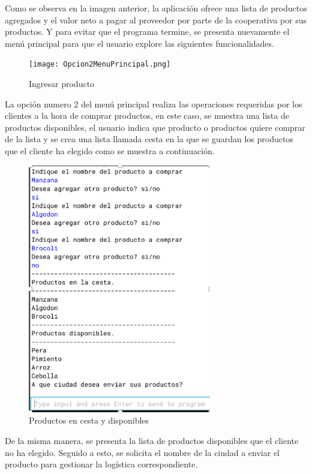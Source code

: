 \documentclass[10pt,a4paper]{article}
\begin{document}
Como se observa en la imagen anterior, la aplicación ofrece  una lista de productos agregados y el valor neto a pagar al proveedor por parte de la cooperativa por sus productos. Y para evitar que el programa termine, se presenta nuevamente el menú principal para que el usuario explore las siguientes funcionalidades.

\begin{figure}[H]
  \centerline{
  \texttt{[image: Opcion2MenuPrincipal.png]}
  }
  \captionsetup{justification=centering}
  \caption{Ingresar producto \label{fig:opcion1MP} }
\end{figure}

La opción numero 2 del menú principal realiza las operaciones requeridas por los clientes a la hora de comprar productos, en este caso, se muestra una lista de productos disponibles, el usuario indica que producto o productos  quiere comprar de la lista y se crea una lista llamada cesta en la que se guardan los productos que el cliente ha elegido como se muestra a continuación.

\begin{figure}[H]
  \centerline{
  \includegraphics[width=8cm]{Cesta.png}
  }
  \captionsetup{justification=centering}
  \caption{Productos en cesta y disponibles \label{fig:opcion1MP} }
\end{figure}

De la misma manera, se presenta la lista de  productos disponibles que el cliente no ha elegido. Seguido a esto, se solicita el nombre de la ciudad a enviar el producto para gestionar la logística correspondiente.
\end{document}
